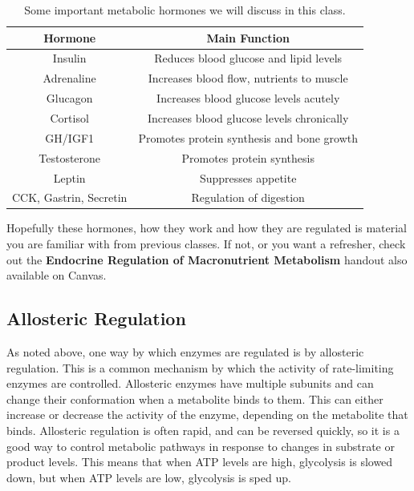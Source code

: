 \documentclass{tufte-handout}
\begin{document}
\begin{table}[h]
\centering
\caption{Some important metabolic hormones we will discuss in this class.}
\label{tab:hormones}
\begin{tabular}{cc}
\hline
\textbf{Hormone}       & \textbf{Main Function}                     \\
\hline
Insulin                & Reduces blood glucose and lipid levels     \\
Adrenaline        & Increases blood flow, nutrients to muscle \\
Glucagon               & Increases blood glucose levels acutely     \\
Cortisol               & Increases blood glucose levels chronically \\
GH/IGF1                & Promotes protein synthesis and bone growth \\
Testosterone           & Promotes protein synthesis                 \\
Leptin                 & Suppresses appetite                        \\
CCK, Gastrin, Secretin & Regulation of digestion                   \\
\hline
\end{tabular}
\end{table}


Hopefully these hormones, how they work and how they are regulated is material you are familiar with from previous classes.  If not, or you want a refresher, check out the \textbf{Endocrine Regulation of Macronutrient Metabolism} handout also available on Canvas.  

\subsection{Allosteric Regulation}
As noted above, one way by which enzymes are regulated is by allosteric regulation.  This is a common mechanism by which the activity of rate-limiting enzymes are controlled.  Allosteric enzymes have multiple subunits and can change their conformation when a metabolite binds to them.  This can either increase or decrease the activity of the enzyme, depending on the metabolite that binds.  Allosteric regulation is often rapid, and can be reversed quickly, so it is a good way to control metabolic pathways in response to changes in substrate or product levels.  This means that when ATP levels are high, glycolysis is slowed down, but when ATP levels are low, glycolysis is sped up.
\end{document}
